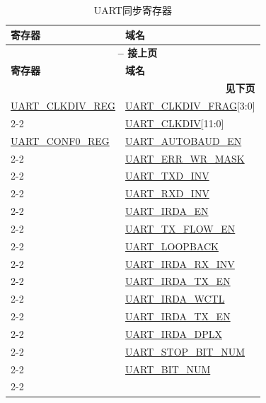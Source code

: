 \documentclass[main\_\_CN.tex]{subfiles}
\begin{document}
\begin{longtable}[c]{|m{6cm}|m{6cm}|}
\caption{UART同步寄存器}
\label{tab:uart-sync-reg} \\
    \hline
    \rowcolor{lightgray}
    \textbf{寄存器} & \textbf{域名} \\\hline
    \endfirsthead

    \multicolumn{2}{c}{\bfseries \tablename\ \thetable{} -- 接上页}\\\hline
    \rowcolor{lightgray}
    \textbf{寄存器} & \textbf{域名} \\\hline
    \endhead

    \multicolumn{2}{r}{\textbf{见下页}} \\
    \endfoot
    \endlastfoot

\hyperref[regdesc:UARTCLKDIVREG]{UART\_CLKDIV\_REG} & \hyperref[fielddesc:UARTCLKDIVFRAG]{UART\_CLKDIV\_FRAG}[3:0] \\\cline{2-2}
 & \hyperref[fielddesc:UARTCLKDIV]{UART\_CLKDIV}[11:0] \\\hline
\hyperref[regdesc:UARTCONF0REG]{UART\_CONF0\_REG}  & \hyperref[fielddesc:UARTAUTOBAUDEN]{UART\_AUTOBAUD\_EN} \\\cline{2-2}
 & \hyperref[fielddesc:UARTERRWRMASK]{UART\_ERR\_WR\_MASK} \\\cline{2-2}
 & \hyperref[fielddesc:UARTTXDINV]{UART\_TXD\_INV} \\\cline{2-2}
 & \hyperref[fielddesc:UARTRXDINV]{UART\_RXD\_INV} \\\cline{2-2}
 & \hyperref[fielddesc:UARTIRDAEN]{UART\_IRDA\_EN} \\\cline{2-2}
 & \hyperref[fielddesc:UARTTXFLOWEN]{UART\_TX\_FLOW\_EN} \\\cline{2-2}
 & \hyperref[fielddesc:UARTLOOPBACK]{UART\_LOOPBACK} \\\cline{2-2}
 & \hyperref[fielddesc:UARTIRDARXINV]{UART\_IRDA\_RX\_INV} \\\cline{2-2}
 & \hyperref[fielddesc:UARTIRDATXEN]{UART\_IRDA\_TX\_EN} \\\cline{2-2}
 & \hyperref[fielddesc:UARTIRDAWCTL]{UART\_IRDA\_WCTL} \\\cline{2-2}
 & \hyperref[fielddesc:UARTIRDATXEN]{UART\_IRDA\_TX\_EN} \\\cline{2-2}
 & \hyperref[fielddesc:UARTIRDADPLX]{UART\_IRDA\_DPLX} \\\cline{2-2}
 & \hyperref[fielddesc:UARTSTOPBITNUM]{UART\_STOP\_BIT\_NUM} \\\cline{2-2}
 & \hyperref[fielddesc:UARTBITNUM]{UART\_BIT\_NUM} \\\cline{2-2}

\end{longtable}
\end{document}
